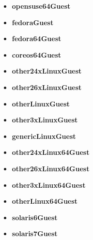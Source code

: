\begin{itemize}
\item \textbf{opensuse64Guest} 
\end{itemize}
\begin{itemize}
\item \textbf{fedoraGuest} 
\end{itemize}
\begin{itemize}
\item \textbf{fedora64Guest} 
\end{itemize}
\begin{itemize}
\item \textbf{coreos64Guest} 
\end{itemize}
\begin{itemize}
\item \textbf{other24xLinuxGuest} 
\end{itemize}
\begin{itemize}
\item \textbf{other26xLinuxGuest} 
\end{itemize}
\begin{itemize}
\item \textbf{otherLinuxGuest} 
\end{itemize}
\begin{itemize}
\item \textbf{other3xLinuxGuest} 
\end{itemize}
\begin{itemize}
\item \textbf{genericLinuxGuest} 
\end{itemize}
\begin{itemize}
\item \textbf{other24xLinux64Guest} 
\end{itemize}
\begin{itemize}
\item \textbf{other26xLinux64Guest} 
\end{itemize}
\begin{itemize}
\item \textbf{other3xLinux64Guest} 
\end{itemize}
\begin{itemize}
\item \textbf{otherLinux64Guest} 
\end{itemize}
\begin{itemize}
\item \textbf{solaris6Guest} 
\end{itemize}
\begin{itemize}
\item \textbf{solaris7Guest} 
\end{itemize}
